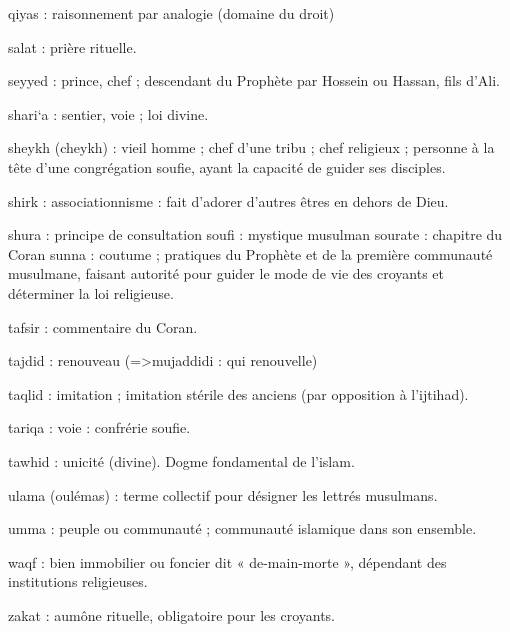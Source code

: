 qiyas : raisonnement par analogie (domaine du droit)

salat : prière rituelle.

seyyed : prince, chef ; descendant du Prophète par Hossein ou Hassan, fils d’Ali.

shari‘a : sentier, voie ; loi divine.

sheykh (cheykh) : vieil homme ; chef d’une tribu ; chef religieux ; personne à la tête d’une congrégation soufie, ayant la capacité de guider ses disciples.

shirk : associationnisme : fait d’adorer d’autres êtres en dehors de Dieu.

shura : principe de consultation soufi : mystique musulman sourate : chapitre du Coran
sunna : coutume ; pratiques du Prophète et de la première communauté musulmane, faisant autorité pour guider le mode de vie des croyants et déterminer la loi religieuse.

tafsir : commentaire du Coran.

tajdid : renouveau (=>mujaddidi : qui renouvelle)

taqlid : imitation ; imitation stérile des anciens (par opposition à l’ijtihad).

tariqa : voie : confrérie soufie.

tawhid : unicité (divine). Dogme fondamental de l’islam.

ulama (oulémas) : terme collectif pour désigner les lettrés musulmans.

umma : peuple ou communauté ; communauté islamique dans son ensemble.

waqf : bien immobilier ou foncier dit « de-main-morte », dépendant des institutions religieuses.

zakat : aumône rituelle, obligatoire pour les croyants.
